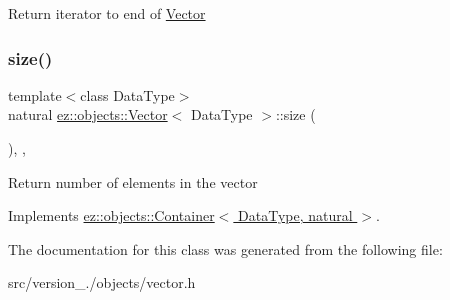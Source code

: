 Return iterator to end of \hyperlink{classez_1_1objects_1_1Vector}{Vector} \mbox{\label{classez_1_1objects_1_1Vector_a0c9401b7eb53dc1bff3becb8d87e5a90}} 
\subsubsection{\texorpdfstring{size()}{size()}}
{\footnotesize\ttfamily template$<$class Data\+Type$>$ \\
natural \hyperlink{classez_1_1objects_1_1Vector}{ez\+::objects\+::\+Vector}$<$ Data\+Type $>$\+::size (\begin{DoxyParamCaption}{ }\end{DoxyParamCaption})\hspace{0.3cm}{\ttfamily [inline]}, {\ttfamily [override]}, {\ttfamily [virtual]}}

Return number of elements in the vector 

Implements \hyperlink{classez_1_1objects_1_1Container_affd294810c6c29530d1d1e3c2151ad28}{ez\+::objects\+::\+Container$<$ Data\+Type, natural $>$}.



The documentation for this class was generated from the following file\+:\begin{DoxyCompactItemize}
\item 
src/version\+\_./objects/vector.\+h\end{DoxyCompactItemize}
